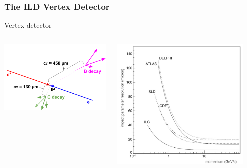 \documentclass{beamer}
\begin{document}
  \begin{frame}[label=vxd]
    \frametitle{The ILD Vertex Detector}

    \vspace{-0.3cm}
    \begin{block}{Vertex detector}

      \begin{columns}[c]
        \begin{column}{5cm}
          \begin{center}
            \includegraphics[width = \textwidth]{Pictures/ImpactParameter.png}
          \end{center}
        \end{column}
        \begin{column}{5cm}
          \centering
          \includegraphics[width = 0.9\textwidth]{Pictures/IPresolution_variousColliders.png}
        \end{column}
      \end{columns}
    \end{block}

\end{frame}
\end{document}
